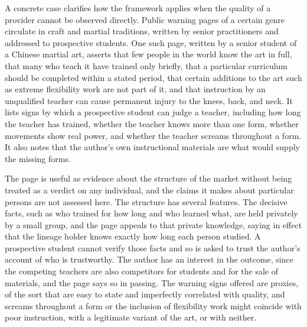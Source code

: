 \documentclass[11pt]{article}
\theoremstyle{definition}
\begin{document}
A concrete case clarifies how the framework applies when the quality of a provider cannot be observed directly. Public warning pages of a certain genre circulate in craft and martial traditions, written by senior practitioners and addressed to prospective students. One such page, written by a senior student of a Chinese martial art, asserts that few people in the world know the art in full, that many who teach it have trained only briefly, that a particular curriculum should be completed within a stated period, that certain additions to the art such as extreme flexibility work are not part of it, and that instruction by an unqualified teacher can cause permanent injury to the knees, back, and neck. It lists signs by which a prospective student can judge a teacher, including how long the teacher has trained, whether the teacher knows more than one form, whether movements show real power, and whether the teacher screams throughout a form. It also notes that the author's own instructional materials are what would supply the missing forms.

The page is useful as evidence about the structure of the market without being treated as a verdict on any individual, and the claims it makes about particular persons are not assessed here. The structure has several features. The decisive facts, such as who trained for how long and who learned what, are held privately by a small group, and the page appeals to that private knowledge, saying in effect that the lineage holder knows exactly how long each person studied. A prospective student cannot verify those facts and so is asked to trust the author's account of who is trustworthy. The author has an interest in the outcome, since the competing teachers are also competitors for students and for the sale of materials, and the page says so in passing. The warning signs offered are proxies, of the sort that are easy to state and imperfectly correlated with quality, and screams throughout a form or the inclusion of flexibility work might coincide with poor instruction, with a legitimate variant of the art, or with neither.
\end{document}
